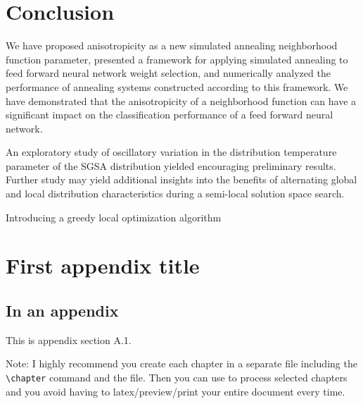 \documentclass[11pt]{afthesis}
\begin{document}
	
	\chapter{Conclusion}
	
	We have proposed anisotropicity as a new simulated annealing neighborhood function parameter, presented a framework for applying simulated annealing to feed forward neural network weight selection, and numerically analyzed the performance of annealing systems constructed according to this framework. We have demonstrated that the anisotropicity of a neighborhood function can have a significant impact on the classification performance of a feed forward neural network.  
	
	An exploratory study of oscillatory variation in the distribution temperature parameter of the SGSA distribution yielded encouraging preliminary results. Further study may yield additional insights into the benefits of alternating global and local distribution characteristics during a semi-local solution space search.
	
	Introducing a greedy local optimization algorithm 
	
	\label{scn:conclusion}
	\appendix		%
	
	\chapter{First appendix title}
	
	\section{In an appendix} 
	
	This is appendix section A.1.
	
	Note: I highly recommend you create each chapter in a separate file
	including the \verb|\chapter| command and \verb|| the file.
	Then you can use \verb|| to process selected chapters and
	you avoid having to latex/preview/print your entire document every
	time.
	
	
\end{document}
